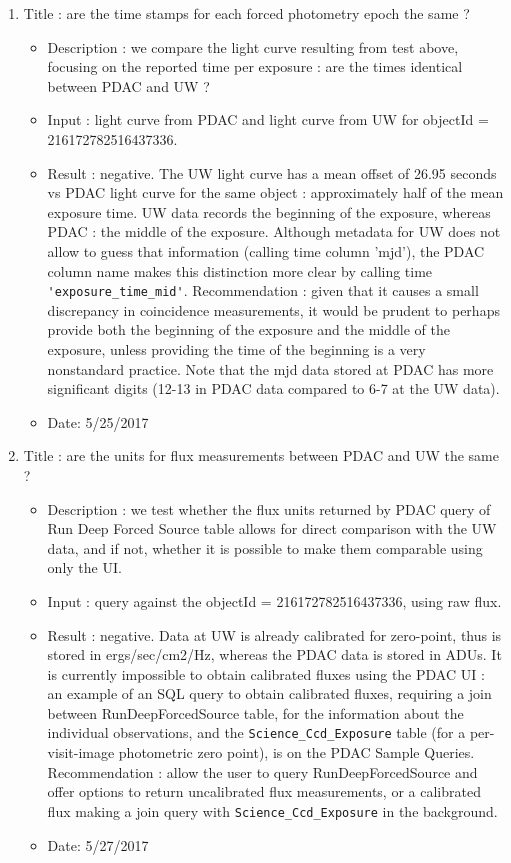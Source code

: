 \documentclass[DM,lsstdraft,toc,usenatbib]{lsstdoc}
\begin{document}
\begin{enumerate}
      \item Title : are the time stamps for each forced photometry epoch the same ? 
    \begin{itemize}
      \item Description : we compare the light curve resulting from test above, focusing on the reported time per exposure : are the times identical between PDAC and  UW ? 
      \item Input : light curve from PDAC and light curve from UW for objectId = 216172782516437336.
      \item Result : negative. The UW light curve has a mean offset of 26.95 seconds vs PDAC light curve for the same object : approximately half of the mean exposure time. UW data records the beginning of the exposure, whereas PDAC  : the middle of the exposure. Although metadata for UW does not allow to guess that information (calling time column 'mjd'), the PDAC column name makes this distinction more clear by calling time \verb|'exposure_time_mid'|. Recommendation : given that it causes  a small discrepancy in coincidence measurements, it would be prudent to perhaps provide both the beginning of the exposure and the middle of the exposure, unless providing the time of the beginning is a very nonstandard practice. Note that the mjd data stored at PDAC has more significant digits (12-13 in PDAC data compared to 6-7 at the UW data). 
      \item Date: 5/25/2017
    \end{itemize}

      \item Title : are the units for  flux measurements between PDAC and UW the same ? 
    \begin{itemize}
      \item Description : we test whether the flux units  returned by PDAC query of Run Deep Forced Source table allows for direct comparison with the UW data, and if not, whether it is possible to make them comparable using only the UI. 
      \item Input : query against the objectId = 216172782516437336, using raw flux. 
      \item Result : negative. Data at UW is already calibrated for zero-point, thus is stored in ergs/sec/cm2/Hz, whereas the PDAC data is stored in ADUs.  It is currently impossible to obtain calibrated fluxes using the PDAC UI : an example of an SQL query to obtain calibrated fluxes, requiring a join between RunDeepForcedSource table, for the information about the individual observations, and the \verb|Science_Ccd_Exposure| table (for a per-visit-image  photometric zero point), is on the PDAC Sample Queries. Recommendation : allow the user to query RunDeepForcedSource and offer options to return uncalibrated flux measurements, or a calibrated flux making a join query with \verb|Science_Ccd_Exposure|  in the background. 
      \item Date: 5/27/2017
    \end{itemize}



\end{enumerate}
\end{document}

